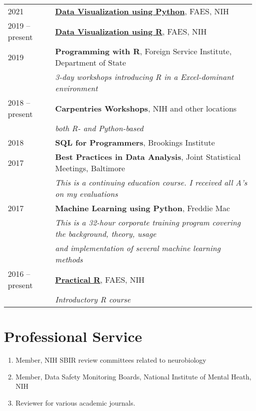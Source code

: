 \documentclass[11pt, a4paper]{awesome-cv}
\providecommand{\tightlist}{%
	\setlength{\itemsep}{0pt}\setlength{\parskip}{0pt}}
\begin{document}
\begin{tabular}{ll}
  2021 & \href{https://www.araastat.com/BIOF440}{\textbf{Data Visualization using Python}}, FAES, NIH \\ 
  2019 -- present & \href{https://www.araastat.com/BIOF439}{\textbf{Data Visualization using R}}, FAES, NIH \\ 
  2019 & \textbf{Programming with R}, Foreign Service Institute, Department of State \\ 
   & \emph{3-day workshops introducing R in a Excel-dominant environment} \\ 
  2018 -- present & \textbf{Carpentries Workshops}, NIH and other locations \\ 
   & \emph{both R- and Python-based} \\ 
  2018 & \textbf{SQL for Programmers}, Brookings Institute \\ 
  2017 & \textbf{Best Practices in Data Analysis}, Joint Statistical Meetings, Baltimore \\ 
   & \emph{This is a continuing education course. I received all A's on my evaluations} \\ 
  2017 & \textbf{Machine Learning using Python}, Freddie Mac \\ 
   & \emph{This is a 32-hour corporate training program covering the background, theory, usage } \\ 
   & \emph{and implementation of several machine learning methods} \\ 
  2016 -- present & \href{https://www.araastat.com/BIOF339}{\textbf{Practical R}}, FAES, NIH \\ 
   & \emph{Introductory R course} \\ 
  \end{tabular}

\hypertarget{professional-service}{%
\section{Professional Service}\label{professional-service}}

\begin{enumerate}
\def\labelenumi{\arabic{enumi}.}
\tightlist
\item
  Member, NIH SBIR review committees related to neurobiology
\item
  Member, Data Safety Monitoring Boards, National Institute of Mental Heath, NIH
\item
  Reviewer for various academic journals.
\end{enumerate}
\end{document}
